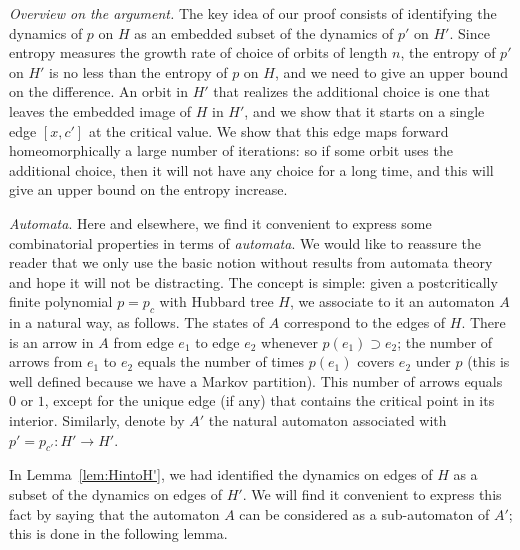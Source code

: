 \documentclass[12pt]{amsart}
\newcommand{\0}{\texttt{0}}
\newcommand{\1}{\texttt{1}}
\theoremstyle{definition}
\numberwithin{equation}{section}
\begin{document}
\emph{Overview on the argument.}
The key idea of our proof consists of identifying the dynamics of $p$ on $H$ as an embedded subset of the dynamics of $p'$ on $H'$. Since entropy measures the growth rate of choice of orbits of length $n$, the entropy of $p'$ on $H'$ is no less than the entropy of $p$ on $H$, and we need to give an upper bound on the difference. An orbit in $H'$ that realizes the additional choice is one that leaves the embedded image of $H$ in $H'$, and we show that it starts on a single edge $[x,c']$ at the critical value. We show that this edge maps forward homeomorphically a large number of iterations: so if some orbit uses the additional choice, then it will not have any choice for a long time, and this will give an upper bound on the entropy increase. 

\emph{Automata}.
Here and elsewhere, we find it convenient to express some combinatorial properties in terms of \emph{automata}.  We would like to reassure the reader that we only use the basic notion without results from automata theory and hope it will not be distracting. The concept is simple: given a postcritically finite polynomial $p=p_{c}$ with Hubbard tree $H$, we associate to it an automaton $A$ in a natural way, as follows. The states of $A$ correspond to the edges of $H$. There is an arrow in $A$ from edge $e_1$ to edge $e_2$ whenever $p(e_1)\supset e_2$; the number of arrows from  $e_1$ to $e_2$ equals the number of times $p(e_1)$ covers $e_2$ under $p$ (this is well defined because we have a Markov partition). This number of arrows equals $0$ or $1$, except for the unique edge (if any) that contains the critical point in its interior. 
Similarly, denote by $A'$ the natural automaton associated with $p'=p_{c'}\colon H'\to H'$. 

In Lemma~\ref{lem:HintoH'}, we had identified the dynamics on edges of $H$ as a subset of the dynamics on edges of $H'$. We will find it convenient to express this fact by saying that the automaton $A$ can be considered as a sub-automaton of $A'$; this is done in the following lemma. 
\end{document}

